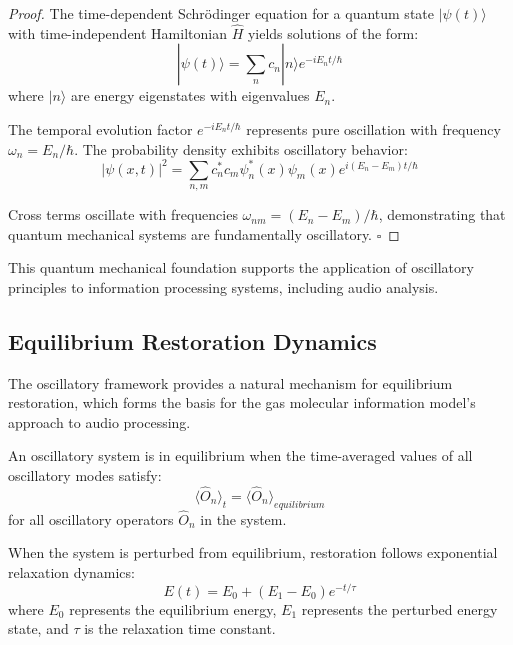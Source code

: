 \begin{proof}
The time-dependent Schrödinger equation for a quantum state $|\psi(t)\rangle$ with time-independent Hamiltonian $\hat{H}$ yields solutions of the form:
\begin{equation}
|\psi(t)\rangle = \sum_n c_n |n\rangle e^{-iE_n t/\hbar}
\end{equation}
where $|n\rangle$ are energy eigenstates with eigenvalues $E_n$.

The temporal evolution factor $e^{-iE_n t/\hbar}$ represents pure oscillation with frequency $\omega_n = E_n/\hbar$. The probability density exhibits oscillatory behavior:
\begin{equation}
|\psi(x,t)|^2 = \sum_{n,m} c_n^* c_m \psi_n^*(x) \psi_m(x) e^{i(E_n - E_m)t/\hbar}
\end{equation}

Cross terms oscillate with frequencies $\omega_{nm} = (E_n - E_m)/\hbar$, demonstrating that quantum mechanical systems are fundamentally oscillatory. $\square$
\end{proof}

This quantum mechanical foundation supports the application of oscillatory principles to information processing systems, including audio analysis.

\subsection{Equilibrium Restoration Dynamics}

The oscillatory framework provides a natural mechanism for equilibrium restoration, which forms the basis for the gas molecular information model's approach to audio processing.

\begin{definition}
An oscillatory system is in equilibrium when the time-averaged values of all oscillatory modes satisfy:
\begin{equation}
\langle\hat{O}_n\rangle_t = \langle\hat{O}_n\rangle_{equilibrium}
\end{equation}
for all oscillatory operators $\hat{O}_n$ in the system.
\end{definition}

When the system is perturbed from equilibrium, restoration follows exponential relaxation dynamics:
\begin{equation}
E(t) = E_0 + (E_1 - E_0) e^{-t/\tau}
\end{equation}
where $E_0$ represents the equilibrium energy, $E_1$ represents the perturbed energy state, and $\tau$ is the relaxation time constant.

